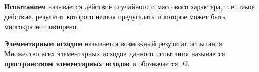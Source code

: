  \textbf{Испытанием} называется действие случайного и массового характера, т.\,е. такое действие, результат которого нельзя предугадать и которое может быть многократно повторено.

 \textbf{Элементарным исходом} называется возможный результат испытания.
Множество всех элементарных исходов данного испытания называется \textbf{пространством элементарных исходов} и обозначается~$\Omega$.